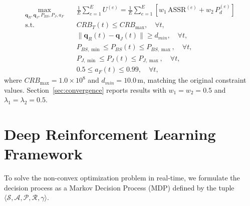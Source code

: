 \documentclass[journal,onecolumn]{IEEEtran}
\begin{document}
\begin{subequations}
\begin{align}
    \max_{\mathbf{q}_R, \mathbf{q}_J, P_{BS}, P_J, a_F} \quad & \frac{1}{E} \sum_{e=1}^{E} U^{(e)} = \frac{1}{E} \sum_{e=1}^{E} \left[ w_1 \,\text{ASSR}^{(e)} + w_2 \,P_d^{(e)} \right] \\
    \text{s.t.} \quad & CRB_T(t) \le CRB_{\max}, \quad \forall t, \\
    & \|\mathbf{q}_R(t) - \mathbf{q}_J(t)\| \ge d_{min}, \quad \forall t, \\
    & P_{BS,\min} \le P_{BS}(t) \le P_{BS,\max}, \quad \forall t, \\
    & P_{J,\min} \le P_J(t) \le P_{J,\max}, \quad \forall t, \\
    & 0.5 \le a_F(t) \le 0.99, \quad \forall t,
\end{align}
\end{subequations}
where $CRB_{\max} = 1.0 \times 10^8$ and $d_{min} = 10.0$\,m, matching the original constraint values. Section~\ref{sec:convergence} reports results with $w_1 = w_2 = 0.5$ and $\lambda_1 = \lambda_2 = 0.5$.

\section{Deep Reinforcement Learning Framework}
To solve the non-convex optimization problem in real-time, we formulate the decision process as a Markov Decision Process (MDP) defined by the tuple $\langle \mathcal{S}, \mathcal{A}, \mathcal{P}, \mathcal{R}, \gamma \rangle$.
\end{document}

